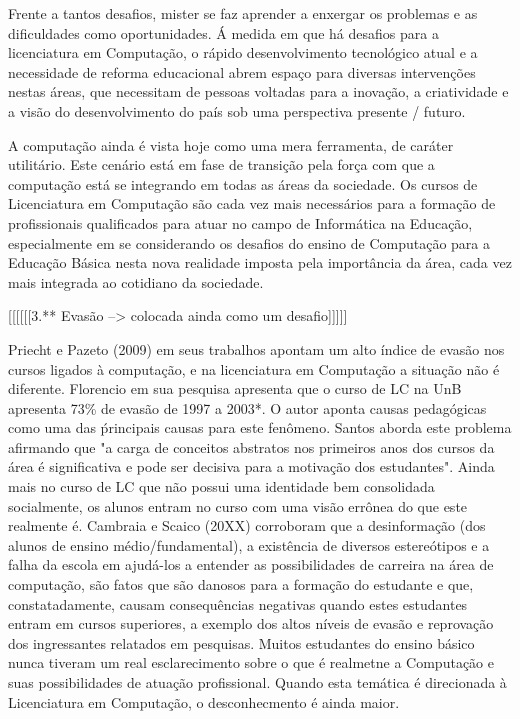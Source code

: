     
    Frente a tantos desafios, mister se faz aprender a enxergar os problemas e as dificuldades como oportunidades. Á medida em que há desafios para a licenciatura em Computação, o rápido desenvolvimento tecnológico atual e a necessidade de reforma educacional abrem espaço para diversas intervenções nestas áreas, que necessitam de pessoas voltadas para a inovação, a criatividade e a visão do desenvolvimento do país sob uma perspectiva presente / futuro.
	
    
    A computação ainda é vista hoje como uma mera ferramenta, de caráter utilitário. Este cenário está em fase de transição pela força com que a computação está se integrando em todas as áreas da sociedade. Os cursos de Licenciatura em Computação são cada vez mais necessários para a
formação de profissionais qualificados para atuar no campo de Informática na Educação, especialmente em se considerando os desafios do ensino de Computação para a Educação Básica nesta nova realidade imposta pela importância da área, cada vez mais integrada ao cotidiano da sociedade. 

[[[[[[3.** Evasão --> colocada ainda como um desafio]]]]]
 
	Priecht e Pazeto (2009) em seus trabalhos apontam um alto índice de evasão nos cursos ligados à computação, e na licenciatura em Computação a situação não é diferente. Florencio em sua pesquisa apresenta que o curso de LC na UnB apresenta 73\% de evasão de 1997 a 2003*. O autor aponta causas pedagógicas como uma das ṕrincipais causas para este fenômeno. Santos aborda este problema afirmando que "a carga de conceitos abstratos nos primeiros anos dos cursos da área é significativa e pode ser decisiva para a motivação dos estudantes". Ainda mais no curso de LC que não possui uma identidade bem consolidada socialmente, os alunos entram no curso com uma visão errônea do que este realmente é.
	Cambraia e Scaico (20XX) corroboram que a desinformação (dos alunos de ensino médio/fundamental), a existência de diversos estereótipos e a falha da escola em ajudá-los a entender as possibilidades de carreira na área de computação, são fatos que são danosos para a formação do estudante e que, constatadamente, causam consequências negativas quando estes estudantes entram em cursos superiores, a exemplo dos altos níveis de evasão e reprovação dos ingressantes relatados em pesquisas. Muitos estudantes do ensino básico nunca tiveram um real esclarecimento sobre o que é realmetne a Computação e suas possibilidades de atuação profissional. Quando esta temática é direcionada à Licenciatura em Computação, o desconhecmento é ainda maior.
 
